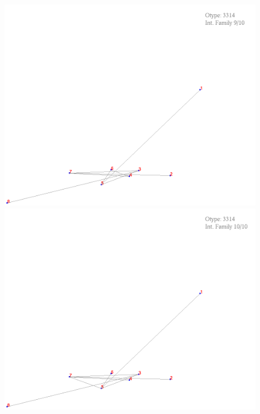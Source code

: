 \documentclass[11pt,epsf,times,letterpaper]{article}
\begin{document}
	\begin{figure}
		\includegraphics[scale=.4]{if_tam0_tam1/5.png}
		\includegraphics[scale=.4]{if_tam0_tam1/6.png}
	\end{figure}
	
\end{document}
